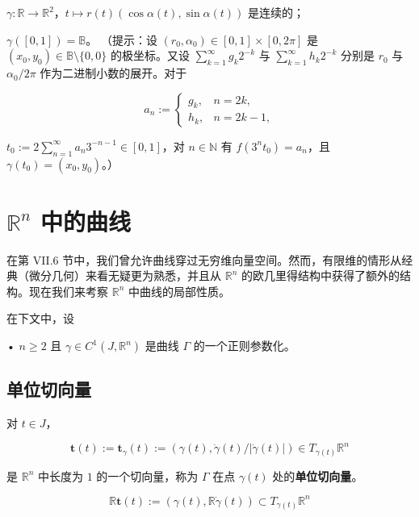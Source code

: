 \begin{exercises}
\begin{items}
$ \gamma : \mathbb{R} \to \mathbb{R}^{2} $，$ t \mapsto r(t)(\cos\alpha(t), \sin\alpha(t)) $ 是连续的；

\item

$ \gamma([0, 1]) = \mathbb{B} $。
（提示：设 $ (r_{0}, \alpha_{0}) \in [0, 1]\times[0, 2\pi] $ 是 $ (x_{0}, y_{0}) \in \mathbb{B}\setminus\{0, 0\} $ 的极坐标。又设 $ \sum_{k=1}^{\infty}g_{k}2^{-k} $ 与 $ \sum_{k=1}^{\infty}h_{k}2^{-k} $ 分别是 $ r_{0} $ 与 $ \alpha_{0}/2\pi $ 作为二进制小数的展开。对于

\begin{equation*}
a_{n} := \begin{cases} g_{k} , & n = 2k , \\ h_{k} , & n = 2k - 1 , \end{cases}
\end{equation*}

\proofhead
$ t_{0} := 2\sum_{n=1}^{\infty}a_{n}3^{-n-1} \in [0, 1] $，对 $ n \in \mathbb{N} $ 有 $ f(3^{n}t_{0}) = a_{n} $，且 $ \gamma(t_{0}) = (x_{0}, y_{0}) $。）
\end{items}

\end{exercises}

\section{$ \mathbb{R}^{n} $ 中的曲线}

在第 VII.6 节中，我们曾允许曲线穿过无穷维向量空间。然而，有限维的情形从经典（微分几何）来看无疑更为熟悉，并且从 $ \mathbb{R}^n $ 的欧几里得结构中获得了额外的结构。现在我们来考察 $ \mathbb{R}^n $ 中曲线的局部性质。

在下文中，设

• $ n \ge 2 $ 且 $ \gamma \in C^1(J, \mathbb{R}^n) $ 是曲线 $ \Gamma $ 的一个正则参数化。

\subsection*{单位切向量}

对 $ t \in J $，

\[
\mathbf{t}(t) := \mathbf{t}_{\gamma}(t) := (\gamma(t), \dot\gamma(t)/|\dot\gamma(t)|) \in T_{\gamma(t)}\mathbb{R}^n
\]

是 $ \mathbb{R}^n $ 中长度为 $ 1 $ 的一个切向量，称为 $ \Gamma $ 在点 $ \gamma(t) $ 处的\textbf{单位切向量}。

\[
\mathbb{R}\mathbf{t}(t) := (\gamma(t), \mathbb{R}\dot\gamma(t)) \subset T_{\gamma(t)}\mathbb{R}^n
\]

